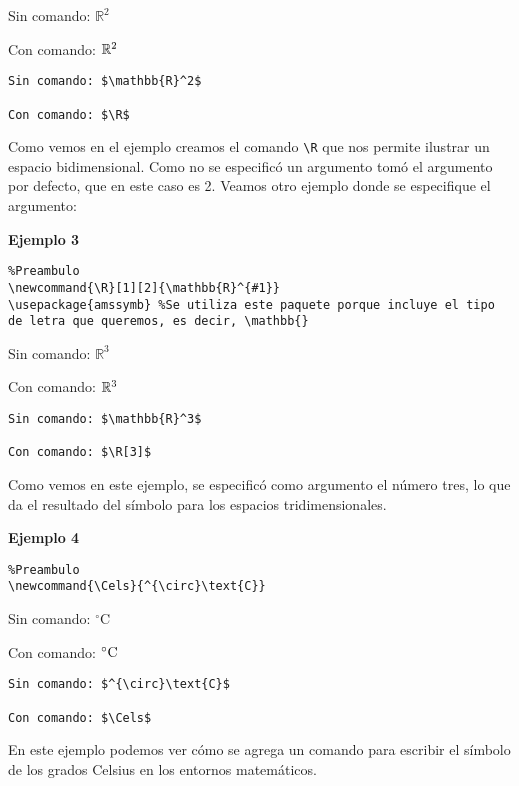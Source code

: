 Sin comando: $\mathbb{R}^2$

Con comando: $\R$

\begin{myquote}
	\begin{lstlisting}
Sin comando: $\mathbb{R}^2$

Con comando: $\R$
	\end{lstlisting}
\end{myquote}

Como vemos en el ejemplo creamos el comando \verb|\R| que nos permite ilustrar un espacio bidimensional. Como no se especificó un argumento tomó el argumento por defecto, que en este caso es 2. Veamos otro ejemplo donde se especifique el argumento:

\textbf{Ejemplo 3}

\begin{myquote}
	\begin{lstlisting}
%Preambulo
\newcommand{\R}[1][2]{\mathbb{R}^{#1}}
\usepackage{amssymb} %Se utiliza este paquete porque incluye el tipo de letra que queremos, es decir, \mathbb{}		
	\end{lstlisting}
\end{myquote}

Sin comando: $\mathbb{R}^3$

Con comando: $\R[3]$

\begin{myquote}
	\begin{lstlisting}
Sin comando: $\mathbb{R}^3$

Con comando: $\R[3]$
	\end{lstlisting}
\end{myquote} 

Como vemos en este ejemplo, se especificó como argumento el número tres, lo que da el resultado del símbolo para los espacios tridimensionales.

\textbf{Ejemplo 4}

\begin{myquote}
	\begin{lstlisting}
%Preambulo
\newcommand{\Cels}{^{\circ}\text{C}}
	\end{lstlisting}
\end{myquote}

Sin comando: $^{\circ}\text{C}$

Con comando: $\Cels$

\begin{myquote}
	\begin{lstlisting}
Sin comando: $^{\circ}\text{C}$

Con comando: $\Cels$
	\end{lstlisting}
\end{myquote} 

En este ejemplo podemos ver cómo se agrega un comando para escribir el símbolo de los grados Celsius en los entornos matemáticos.

